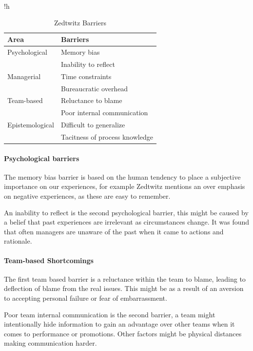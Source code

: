 \begin{table}{!h}
	\begin{center}
	\caption{Zedtwitz\cite{Zedtwitz2002} Barriers}
	\label{table:zedwitz-barriers}
	\begin{tabular}{p{} p{}}
	\hline
	Area & Barriers \\
	\hline
	Psychological & Memory bias \\ 
	& Inability to reflect \\
	Managerial & Time constraints \\
	& Bureaucratic overhead \\
	Team-based & Reluctance to blame \\
	& Poor internal communication \\
	Epistemological & Difficult to generalize \\
	& Tacitness of process knowledge \\
	\hline
	\end{tabular}
	\end{center}
\end{table}

\paragraph{Psychological barriers}
The memory bias barrier is based on the human tendency to place a subjective importance on our experiences, for example Zedtwitz mentions an over emphasis on negative experiences, as these are easy to remember. 

An inability to reflect is the second psychological barrier, this might be caused by a belief that past experiences are irrelevant as circumstances change. It was found that often managers are unaware of the past when it came to actions and rationale.

\paragraph{Team-based Shortcomings}
The first team based barrier is a reluctance within the team to blame, leading to deflection of blame from the real issues. This might be as a result of an aversion to accepting personal failure or fear of embarrassment. 

Poor team internal communication is the second barrier, a team might intentionally hide information to gain an advantage over other teams when it comes to performance or promotions. Other factors might be physical distances making communication harder.

